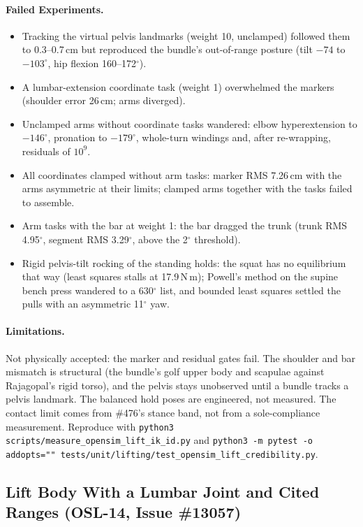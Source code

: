 \documentclass[11pt,a4paper]{article}
\begin{document}
\paragraph{Failed Experiments.}
\begin{itemize}[nosep]
\item Tracking the virtual pelvis landmarks (weight 10, unclamped) followed
  them to 0.3--0.7\,cm but reproduced the bundle's out-of-range posture (tilt
  $-74$ to $-103^\circ$, hip flexion 160--172$^\circ$).
\item A lumbar-extension coordinate task (weight 1) overwhelmed the markers
  (shoulder error 26\,cm; arms diverged).
\item Unclamped arms without coordinate tasks wandered: elbow
  hyperextension to $-146^\circ$, pronation to $-179^\circ$, whole-turn
  windings and, after re-wrapping, residuals of $10^9$.
\item All coordinates clamped without arm tasks: marker RMS 7.26\,cm with the
  arms asymmetric at their limits; clamped arms together with the tasks failed
  to assemble.
\item Arm tasks with the bar at weight 1: the bar dragged the trunk (trunk RMS
  4.95$^\circ$, segment RMS 3.29$^\circ$, above the 2$^\circ$ threshold).
\item Rigid pelvis-tilt rocking of the standing holds: the squat has no
  equilibrium that way (least squares stalls at 17.9\,N\,m); Powell's method
  on the supine bench press wandered to a 630$^\circ$ list, and bounded least
  squares settled the pulls with an asymmetric 11$^\circ$ yaw.
\end{itemize}

\paragraph{Limitations.} Not physically accepted: the marker and residual
gates fail. The shoulder and bar mismatch is structural (the bundle's golf
upper body and scapulae against Rajagopal's rigid torso), and the pelvis stays
unobserved until a bundle tracks a pelvis landmark. The balanced hold poses
are engineered, not measured. The contact limit comes from \#476's stance band,
not from a sole-compliance measurement.
Reproduce with \texttt{python3 scripts/measure\_opensim\_lift\_ik\_id.py} and
\texttt{python3 -m pytest -o addopts="" tests/unit/lifting/test\_opensim\_lift\_credibility.py}.

\subsection{Lift Body With a Lumbar Joint and Cited Ranges (OSL-14, Issue \#13057)}
\end{document}
